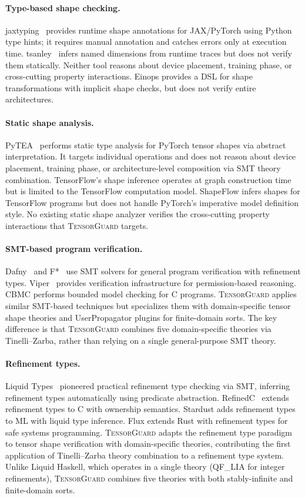 \documentclass[10pt]{article}
\newcommand{\tguard}{\textsc{TensorGuard}}
\theoremstyle{plain}
\theoremstyle{definition}
\theoremstyle{remark}
\begin{document}
\paragraph{Type-based shape checking.}
jaxtyping~\cite{jaxtyping} provides runtime shape annotations for
JAX/PyTorch using Python type hints; it requires manual annotation
and catches errors only at execution time.
tsanley~\cite{tsanley} infers named dimensions from runtime traces
but does not verify them statically.  Neither tool reasons about
device placement, training phase, or cross-cutting property
interactions.  Einops provides a DSL for shape transformations with
implicit shape checks, but does not verify entire architectures.

\paragraph{Static shape analysis.}
PyTEA~\cite{pytea} performs static type analysis for PyTorch tensor
shapes via abstract interpretation.  It targets individual
operations and does not reason about device placement, training
phase, or architecture-level composition via SMT theory
combination.  TensorFlow's shape inference operates at graph
construction time but is limited to the TensorFlow computation
model.  ShapeFlow infers shapes for TensorFlow programs but does
not handle PyTorch's imperative model definition style.
No existing static shape analyzer verifies the cross-cutting
property interactions that \tguard{} targets.

\paragraph{SMT-based program verification.}
Dafny~\cite{leino10} and F*~\cite{fstar} use SMT solvers for
general program verification with refinement types.
Viper~\cite{muller16} provides verification infrastructure for
permission-based reasoning.  CBMC performs bounded model checking
for C programs.  \tguard{} applies similar SMT-based techniques
but specializes them with domain-specific tensor shape theories
and UserPropagator plugins for finite-domain sorts.  The key
difference is that \tguard{} combines five domain-specific theories
via Tinelli--Zarba, rather than relying on a single general-purpose
SMT theory.

\paragraph{Refinement types.}
Liquid Types~\cite{flanagan06} pioneered practical refinement type
checking via SMT, inferring refinement types automatically using
predicate abstraction.  RefinedC~\cite{refinedc} extends refinement
types to C with ownership semantics.  Stardust adds refinement
types to ML with liquid type inference.  Flux extends Rust with
refinement types for safe systems programming.
\tguard{} adapts the refinement type paradigm to tensor shape
verification with domain-specific theories, contributing the first
application of Tinelli--Zarba theory combination to a refinement
type system.  Unlike Liquid Haskell, which operates in a single
theory (QF\_LIA for integer refinements), \tguard{} combines
five theories with both stably-infinite and finite-domain sorts.
\end{document}
